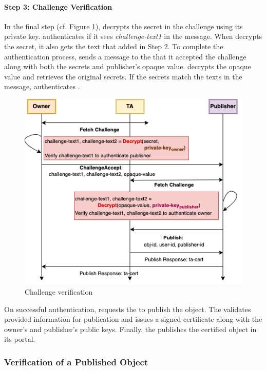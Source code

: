 \paragraph{Step 3: Challenge Verification}

In the final step (cf. Figure \ref{fig:challenge3}), \owner decrypts the secret in the challenge using its private key. \Owner authenticates \publisher if it sees {\em challenge-text1} in the message. When \owner decrypts the secret, it also gets the text that \publisher added in Step 2. To complete the authentication process, \owner sends a message to the \publisher that it accepted the challenge along with both the secrets and publisher's opaque value. \Publisher decrypts the opaque value and retrieves the original secrets. If the secrets match the texts in the message, \publisher authenticates \owner. 

\begin{figure}[htbp]
  \centering
  \includegraphics[scale=0.45]{challenge3.png}
  \caption{Challenge verification}
  \label{fig:challenge3}
\end{figure}

On successful authentication, \publisher requests the \ta to publish the object. The \ta validates provided information for publication and issues a signed certificate along with the owner's and publisher's public keys. Finally, the \publisher publishes the certified object in its portal.

\subsubsection{Verification of a Published Object}
\label{sec:verify}

